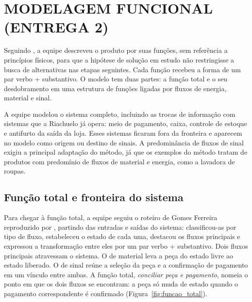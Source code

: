 
\section{MODELAGEM FUNCIONAL (ENTREGA 2)}
\label{sec:modelagem_funcional}

Seguindo , a equipe descreveu o produto por suas funções, sem referência a princípios físicos, para que a hipótese de solução em estudo não restringisse a busca de alternativas nas etapas seguintes. Cada função recebeu a forma de um par verbo + substantivo. O modelo tem duas partes: a função total e o seu desdobramento em uma estrutura de funções ligadas por fluxos de energia, material e sinal.

A equipe modelou o sistema completo, incluindo as trocas de informação com sistemas que a Riachuelo já opera: meio de pagamento, caixa, controle de estoque e antifurto da saída da loja. Esses sistemas ficaram fora da fronteira e aparecem no modelo como origem ou destino de sinais. A predominância de fluxos de sinal exigiu a principal adaptação do método, já que os exemplos do método tratam de produtos com predomínio de fluxos de material e energia, como a lavadora de roupas.

\subsection{Função total e fronteira do sistema}
\label{sec:funcao_total}

Para chegar à função total, a equipe seguiu o roteiro de Gomes Ferreira reproduzido por , partindo das entradas e saídas do sistema: classificou-as por tipo de fluxo, estabeleceu o estado de cada uma, destacou os fluxos principais e expressou a transformação entre eles por um par verbo + substantivo. Dois fluxos principais atravessam o sistema. O de material leva a peça do estado livre ao estado liberado. O de sinal reúne a seleção da peça e a confirmação de pagamento em um vínculo entre ambas. A função total, \emph{conciliar peça e pagamento}, nomeia o ponto em que os dois fluxos se encontram: a peça só muda de estado quando o pagamento correspondente é confirmado (Figura~\ref{fig:funcao_total}).

